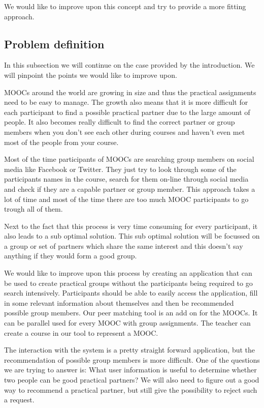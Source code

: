 We would like to improve upon this concept and try to provide a more fitting approach.

\subsection*{Problem definition}
In this subsection we will continue on the case provided by the introduction.
We will pinpoint the points we would like to improve upon.

MOOCs around the world are growing in size and thus the practical assignments need to be easy to manage.
The growth also means that it is more difficult for each participant to find a possible practical partner due to the large amount of people.
It also becomes really difficult to find the correct partner or group members when you don't see each other during courses and haven't even met most of the people from your course.

Most of the time participants of MOOCs are searching group members on social media like Facebook or Twitter.
They just try to look through some of the participants names in the course, search for them on-line through social media and check if they are a capable partner or group member.
This approach takes a lot of time and most of the time there are too much MOOC participants to go trough all of them.

Next to the fact that this process is very time consuming for every participant, it also leads to a sub optimal solution.
This sub optimal solution will be focussed on a group or set of partners which share the same interest and this doesn't say anything if they would form a good group.

We would like to improve upon this process by creating an application that can be used to create practical groups without the participants being required to go search intensively.
Participants should be able to easily access the application, fill in some relevant information about themselves and then be recommended possible group members.
Our peer matching tool is an add on for the MOOCs. 
It can be parallel used for every MOOC with group assignments.
The teacher can create a course in our tool to represent a MOOC.

The interaction with the system is a pretty straight forward application, but the recommendation of possible group members is more difficult.
One of the questions we are trying to answer is: What user information is useful to determine whether two people can be good practical partners?
We will also need to figure out a good way to recommend a practical partner, but still give the possibility to reject such a request.\\

